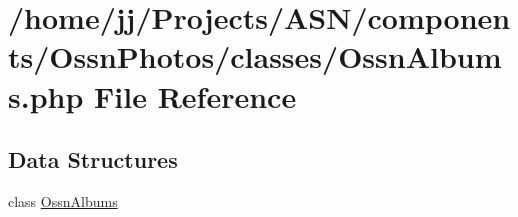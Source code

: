 \hypertarget{_ossn_albums_8php}{}\section{/home/jj/\+Projects/\+A\+S\+N/components/\+Ossn\+Photos/classes/\+Ossn\+Albums.php File Reference}
\label{_ossn_albums_8php}
\subsection*{Data Structures}
\begin{DoxyCompactItemize}
\item 
class \hyperlink{class_ossn_albums}{Ossn\+Albums}
\end{DoxyCompactItemize}
